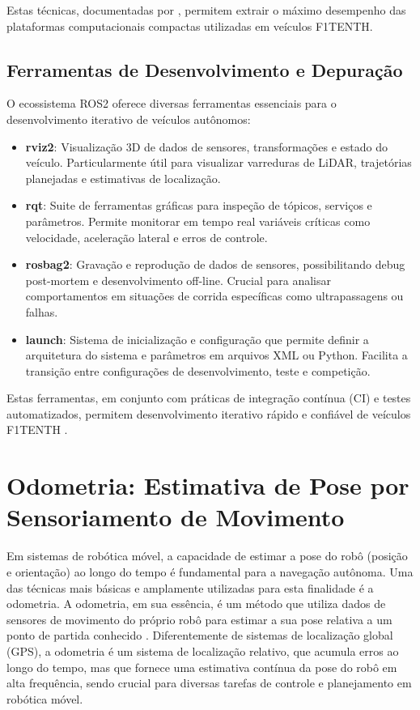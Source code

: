 Estas técnicas, documentadas por \cite{kronauer2021latency}, permitem extrair o
máximo desempenho das plataformas computacionais compactas utilizadas em
veículos F1TENTH.

\subsection{Ferramentas de Desenvolvimento e Depuração}

O ecossistema ROS2 oferece diversas ferramentas essenciais para o
desenvolvimento iterativo de veículos autônomos:

\begin{itemize}
    \item \textbf{rviz2}: Visualização 3D de dados de sensores, transformações e estado do veículo. Particularmente útil para visualizar varreduras de LiDAR, trajetórias planejadas e estimativas de localização.
    \item \textbf{rqt}: Suite de ferramentas gráficas para inspeção de tópicos, serviços e parâmetros. Permite monitorar em tempo real variáveis críticas como velocidade, aceleração lateral e erros de controle.
    \item \textbf{rosbag2}: Gravação e reprodução de dados de sensores, possibilitando debug post-mortem e desenvolvimento off-line. Crucial para analisar comportamentos em situações de corrida específicas como ultrapassagens ou falhas.
    \item \textbf{launch}: Sistema de inicialização e configuração que permite definir a arquitetura do sistema e parâmetros em arquivos XML ou Python. Facilita a transição entre configurações de desenvolvimento, teste e competição.
\end{itemize}

Estas ferramentas, em conjunto com práticas de integração contínua (CI) e
testes automatizados, permitem desenvolvimento iterativo rápido e confiável de
veículos F1TENTH \cite{macenski2022robot}.

\section{Odometria: Estimativa de Pose por Sensoriamento de Movimento}

Em sistemas de robótica móvel, a capacidade de estimar a pose do robô (posição
e orientação) ao longo do tempo é fundamental para a navegação autônoma. Uma
das técnicas mais básicas e amplamente utilizadas para esta finalidade é a
odometria. A odometria, em sua essência, é um método que utiliza dados de
sensores de movimento do próprio robô para estimar a sua pose relativa a um
ponto de partida conhecido \cite{thrun2005}. Diferentemente de sistemas de
localização global (GPS), a odometria é um sistema de localização relativo, que
acumula erros ao longo do tempo, mas que fornece uma estimativa contínua da
pose do robô em alta frequência, sendo crucial para diversas tarefas de
controle e planejamento em robótica móvel.

